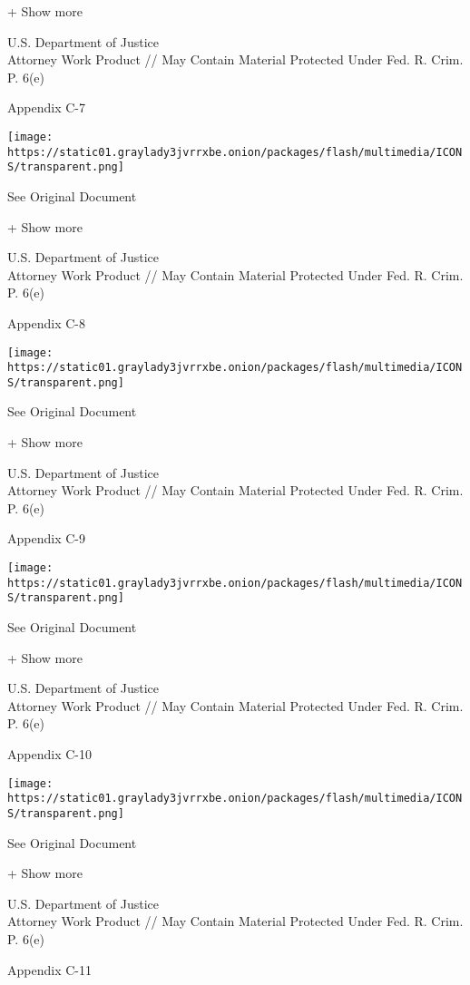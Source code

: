 + Show more

U.S. Department of Justice\\
Attorney Work Product // May Contain Material Protected Under Fed. R.
Crim. P. 6(e)

Appendix C-7

\protect\hyperlink{}{}

\texttt{[image: https://static01.graylady3jvrrxbe.onion/packages/flash/multimedia/ICONS/transparent.png]}

See Original Document

+ Show more

U.S. Department of Justice\\
Attorney Work Product // May Contain Material Protected Under Fed. R.
Crim. P. 6(e)

Appendix C-8

\protect\hyperlink{}{}

\texttt{[image: https://static01.graylady3jvrrxbe.onion/packages/flash/multimedia/ICONS/transparent.png]}

See Original Document

+ Show more

U.S. Department of Justice\\
Attorney Work Product // May Contain Material Protected Under Fed. R.
Crim. P. 6(e)

Appendix C-9

\protect\hyperlink{}{}

\texttt{[image: https://static01.graylady3jvrrxbe.onion/packages/flash/multimedia/ICONS/transparent.png]}

See Original Document

+ Show more

U.S. Department of Justice\\
Attorney Work Product // May Contain Material Protected Under Fed. R.
Crim. P. 6(e)

Appendix C-10

\protect\hyperlink{}{}

\texttt{[image: https://static01.graylady3jvrrxbe.onion/packages/flash/multimedia/ICONS/transparent.png]}

See Original Document

+ Show more

U.S. Department of Justice\\
Attorney Work Product // May Contain Material Protected Under Fed. R.
Crim. P. 6(e)

Appendix C-11

